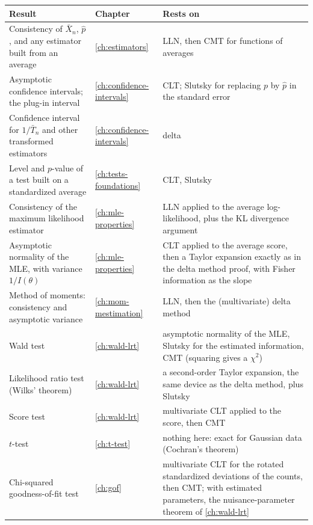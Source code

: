 \begin{small}
\begin{longtable}{@{}>{\raggedright\arraybackslash}p{2.55in}>{\raggedright\arraybackslash}p{0.9in}>{\raggedright\arraybackslash}p{2.45in}@{}}
\toprule
Result & Chapter & Rests on \\
\midrule
\endhead
\bottomrule
\endlastfoot
Consistency of $\bar{X}_n$, $\hat{p}$, and any estimator built from an average & \cref{ch:estimators} & LLN, then CMT for functions of averages \\[3pt]
Asymptotic confidence intervals; the plug-in interval & \cref{ch:confidence-intervals} & CLT; Slutsky for replacing $p$ by $\hat{p}$ in the standard error \\[3pt]
Confidence interval for $1/\bar{T}_n$ and other transformed estimators & \cref{ch:confidence-intervals} & delta \\[3pt]
Level and $p$-value of a test built on a standardized average & \cref{ch:tests-foundations} & CLT, Slutsky \\[3pt]
Consistency of the maximum likelihood estimator & \cref{ch:mle-properties} & LLN applied to the average log-likelihood, plus the KL divergence argument \\[3pt]
Asymptotic normality of the MLE, with variance $1/I(\theta)$ & \cref{ch:mle-properties} & CLT applied to the average score, then a Taylor expansion exactly as in the delta method proof, with Fisher information as the slope \\[3pt]
Method of moments: consistency and asymptotic variance & \cref{ch:mom-mestimation} & LLN, then the (multivariate) delta method \\[3pt]
Wald test & \cref{ch:wald-lrt} & asymptotic normality of the MLE, Slutsky for the estimated information, CMT (squaring gives a $\chi^2$) \\[3pt]
Likelihood ratio test (Wilks' theorem) & \cref{ch:wald-lrt} & a second-order Taylor expansion, the same device as the delta method, plus Slutsky \\[3pt]
Score test & \cref{ch:wald-lrt} & multivariate CLT applied to the score, then CMT \\[3pt]
$t$-test & \cref{ch:t-test} & nothing here: exact for Gaussian data (Cochran's theorem) \\[3pt]
Chi-squared goodness-of-fit test & \cref{ch:gof} & multivariate CLT for the rotated standardized deviations of the counts, then CMT; with estimated parameters, the nuisance-parameter theorem of \cref{ch:wald-lrt} \\[3pt]

\end{longtable}
\end{small}
